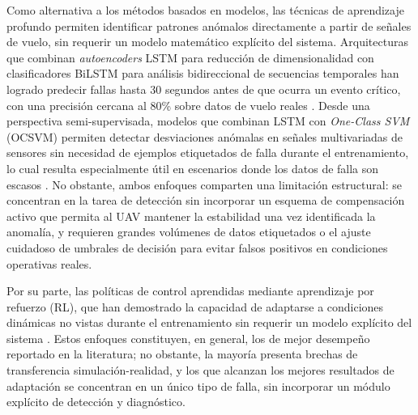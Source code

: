 \noindent Como alternativa a los métodos basados en modelos, las 
técnicas de aprendizaje profundo permiten identificar patrones 
anómalos directamente a partir de señales de vuelo, sin requerir un 
modelo matemático explícito del sistema. Arquitecturas que combinan 
\textit{autoencoders} LSTM para reducción de dimensionalidad con 
clasificadores BiLSTM para análisis bidireccional de secuencias 
temporales han logrado predecir fallas hasta 30 segundos antes de 
que ocurra un evento crítico, con una precisión cercana al 80\% 
sobre datos de vuelo reales \cite{ozcan2024}. Desde una perspectiva 
semi-supervisada, modelos que combinan LSTM con \textit{One-Class 
SVM} (OCSVM) permiten detectar desviaciones anómalas en señales 
multivariadas de sensores sin necesidad de ejemplos etiquetados de 
falla durante el entrenamiento, lo cual resulta especialmente útil 
en escenarios donde los datos de falla son escasos \cite{li2021}. 
No obstante, ambos enfoques comparten una limitación estructural: 
se concentran en la tarea de detección sin incorporar un esquema de 
compensación activo que permita al UAV mantener la estabilidad una 
vez identificada la anomalía, y requieren grandes volúmenes de 
datos etiquetados o el ajuste cuidadoso de umbrales de decisión 
para evitar falsos positivos en condiciones operativas reales.

\noindent Por su parte, las políticas de control aprendidas mediante 
aprendizaje por refuerzo (RL), que han demostrado la 
capacidad de adaptarse a condiciones dinámicas no vistas durante el 
entrenamiento sin requerir un modelo explícito del sistema 
\cite{liu2024, sohege2021, kim2025}. Estos enfoques constituyen, en 
general, los de mejor desempeño reportado en la literatura; no 
obstante, la mayoría presenta brechas de transferencia 
simulación-realidad, y los que alcanzan los mejores resultados de 
adaptación se concentran en un único tipo de falla, sin incorporar 
un módulo explícito de detección y diagnóstico.
%


